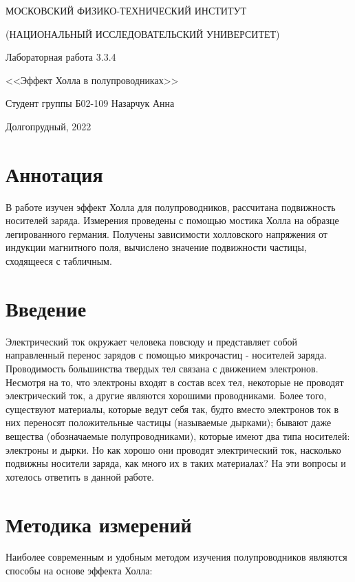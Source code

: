 \documentclass[a4paper,12pt]{article} %
\begin{document}
\begin{titlepage}

\thispagestyle{empty}

\centerline{МОСКОВСКИЙ ФИЗИКО-ТЕХНИЧЕСКИЙ ИНСТИТУТ}
\centerline{(НАЦИОНАЛЬНЫЙ ИССЛЕДОВАТЕЛЬСКИЙ УНИВЕРСИТЕТ)}

\vfill

\centerline{\huge{Лабораторная работа 3.3.4}}
\centerline{\LARGE{<<Эффект Холла в полупроводниках>>}}

\vfill

Студент группы Б02-109 \hfill Назарчук Анна

\vfill

\centerline{Долгопрудный, 2022}
\clearpage
\end{titlepage} 

\section{Аннотация}
В работе изучен эффект Холла для полупроводников, рассчитана подвижность носителей заряда. Измерения проведены с помощью мостика Холла на образце легированного германия. Получены зависимости холловского напряжения от индукции магнитного поля, вычислено значение подвижности частицы, сходящееся с табличным. 

\section{Введение}
Электрический ток окружает человека повсюду и представляет собой направленный перенос зарядов с помощью микрочастиц - носителей заряда. Проводимость большинства твердых тел связана с движением электронов. Несмотря на то, что электроны входят в состав всех тел, некоторые не проводят электрический ток, а другие являются хорошими проводниками. Более того, существуют материалы, которые ведут себя так, будто вместо электронов ток в них переносят положительные частицы (называемые дырками); бывают даже вещества (обозначаемые полупроводниками), которые имеют два типа носителей: электроны и дырки. Но как хорошо они проводят электрический ток, насколько подвижны носители заряда, как много их в таких материалах? На эти вопросы и хотелось ответить в данной работе.


\section{Методика измерений}
Наиболее современным и удобным методом изучения полупроводников являются способы на основе эффекта Холла:
\end{document}
